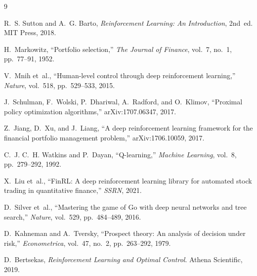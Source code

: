 \documentclass[12pt,a4paper]{article}
\begin{document}

\begin{thebibliography}{9}

R.~S. Sutton and A.~G. Barto,
\emph{Reinforcement Learning: An Introduction}, 2nd~ed.
MIT Press, 2018.

H.~Markowitz,
``Portfolio selection,''
\emph{The Journal of Finance}, vol.~7, no.~1, pp.~77--91, 1952.

V.~Mnih et~al.,
``Human-level control through deep reinforcement learning,''
\emph{Nature}, vol.~518, pp.~529--533, 2015.

J.~Schulman, F.~Wolski, P.~Dhariwal, A.~Radford, and O.~Klimov,
``Proximal policy optimization algorithms,''
arXiv:1707.06347, 2017.

Z.~Jiang, D.~Xu, and J.~Liang,
``A deep reinforcement learning framework for the financial portfolio
management problem,''
arXiv:1706.10059, 2017.

C.~J. C.~H. Watkins and P.~Dayan,
``Q-learning,''
\emph{Machine Learning}, vol.~8, pp.~279--292, 1992.

X.~Liu et~al.,
``FinRL: A deep reinforcement learning library for automated stock trading
in quantitative finance,''
\emph{SSRN}, 2021.

D.~Silver et~al.,
``Mastering the game of Go with deep neural networks and tree search,''
\emph{Nature}, vol.~529, pp.~484--489, 2016.

D.~Kahneman and A.~Tversky,
``Prospect theory: An analysis of decision under risk,''
\emph{Econometrica}, vol.~47, no.~2, pp.~263--292, 1979.

D.~Bertsekas,
\emph{Reinforcement Learning and Optimal Control}.
Athena Scientific, 2019.

\end{thebibliography}
\end{document}
